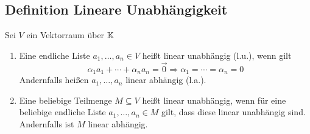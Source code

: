 \subsection{Definition Lineare Unabhängigkeit}
Sei $V$ ein Vektorraum über $\mathbb{K}$
\begin{enumerate}[label = (\alph*)]
    \item Eine endliche Liste $a_1, \ldots, a_n \in V$ heißt linear unabhängig
        (l.u.), wenn gilt
        \begin{equation*}
            \alpha_1 a_1 + \cdots + \alpha_n a_n = \vec{0}
            \Rightarrow \alpha_1 = \cdots = \alpha_n  = 0
        \end{equation*}
        Andernfalls heißen $a_1, \ldots, a_n$ linear abhängig (l.a.).
    \item Eine beliebige Teilmenge $M \subseteq V$ heißt linear unabhängig, wenn
        für eine beliebige endliche Liste $a_1, \ldots, a_n \in M$ gilt, dass
        diese linear unabhängig sind. Andernfalls ist $M$ linear abhängig.
\end{enumerate}


